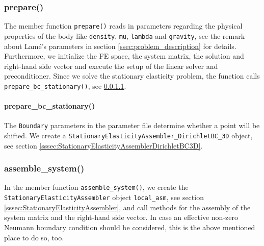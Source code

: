 \documentclass[a4paper, 11pt, twoside]{article}
\theoremstyle{plain}
\theoremstyle{definition}
\begin{document}

\subsubsection{prepare()}

The member function \verb'prepare()' reads in parameters regarding the physical properties of the body like \verb'density', \verb'mu', \verb'lambda' and \verb'gravity', see the remark about Lam\'{e}'s parameters in section \ref{ssec:problem_description} for details.
Furthermore, we initialize the FE space, the system matrix, the solution and right-hand side vector and execute the setup of the linear solver and preconditioner.
Since we solve the stationary elasticity problem, the function calls \verb'prepare_bc_stationary()', see \ref{para:prepare_bc_stationary}.





\paragraph{prepare\_bc\_stationary()}
\label{para:prepare_bc_stationary}

The \verb'Boundary' parameters in the parameter file determine whether a point will be shifted.
We create a \verb'StationaryElasticityAssembler_DirichletBC_3D' object, see section \ref{sssec:StationaryElasticityAssemblerDirichletBC3D}.





\subsubsection{assemble\_system()}
\label{sssec:assemble_system}

In the member function \verb'assemble_system()', we create the \verb'StationaryElasticityAssembler' object \verb'local_asm', see section \ref{sssec:StationaryElasticityAssembler}, and call methods for the assembly of the system matrix and the right-hand side vector.
In case an effective non-zero Neumann boundary condition should be considered, this is the above mentioned place to do so, too.


\end{document}
